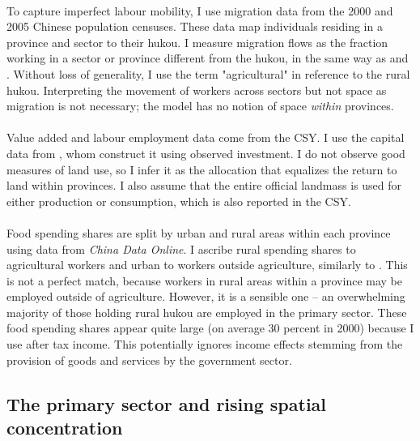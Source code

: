 \documentclass[]{article}
\theoremstyle{plain}
\begin{document}
\paragraph*{}
To capture imperfect labour mobility, I use migration data from the 2000 and 2005 Chinese population censuses. These data map individuals residing in a province and sector to their hukou. I measure migration flows as the fraction working in a sector or province different from the hukou, in the same way as \cite{tombezhu} and \cite{hao2020}. Without loss of generality, I use the term "agricultural" in reference to the rural hukou. Interpreting the movement of workers across sectors but not space as migration is not necessary; the model has no notion of space \textit{within} provinces.
\paragraph*{}
Value added and labour employment data come from the CSY. I use the capital data from \cite{hao2020}, whom construct it using observed investment. I do not observe good measures of land use, so I infer it as the allocation that equalizes the return to land within provinces. I also assume that the entire official landmass is used for either production or consumption, which is also reported in the CSY. 
\paragraph*{}
Food spending shares are split by urban and rural areas within each province using data from \textit{China Data Online}. I ascribe rural spending shares to agricultural workers and urban to workers outside agriculture, similarly to \cite{hao2020}. This is not a perfect match, because workers in rural areas within a province may be employed outside of agriculture. However, it is a sensible one -- an overwhelming majority of those holding rural hukou are employed in the primary sector. These food spending shares appear quite large (on average 30 percent in 2000) because I use after tax income. This potentially ignores income effects stemming from the provision of goods and services by the government sector.  

\subsection*{The primary sector and rising spatial concentration}
\end{document}
